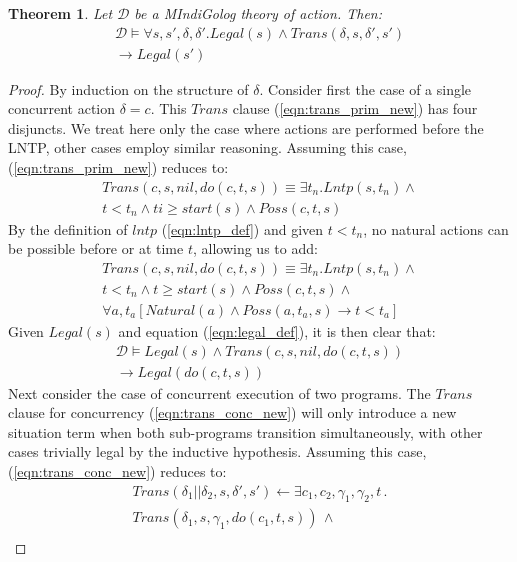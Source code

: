 \documentclass[letterpaper]{article}
\newtheorem{theorem}{Theorem}
\begin{document}
\begin{theorem}
\label{thm:trans_legal}
Let $\mathcal{D}$ be a MIndiGolog theory of action. Then:
\begin{multline*}
\mathcal{D} \models \forall s,s',\delta,\delta'.Legal(s)\wedge Trans(\delta,s,\delta',s')\\
\rightarrow Legal(s')
\end{multline*}
\end{theorem}

\begin{proof}
By induction on the structure of $\delta$.
Consider first the case of a single concurrent action $\delta=c$.  This
$Trans$ clause (\ref{eqn:trans_prim_new}) has four disjuncts. We treat
here only the
case where actions are performed before the LNTP, other
cases employ similar reasoning.
Assuming this case, (\ref{eqn:trans_prim_new}) reduces to:
\begin{multline*}
Trans(c,s,nil,do(c,t,s)) \equiv \exists t_n . Lntp(s,t_n) \wedge \\
  t < t_n \wedge ti \geq start(s) \wedge Poss(c,t,s)
\end{multline*}
By the definition of $lntp$ (\ref{eqn:lntp_def}) and given $t < t_n$,
no natural actions
can be possible before or at time $t$, allowing us to add:
\begin{multline*}
Trans(c,s,nil,do(c,t,s)) \equiv \exists t_n . Lntp(s,t_n) \wedge \\
  t < t_n \wedge t \geq start(s) \wedge Poss(c,t,s) \wedge\\
  \forall a,t_a \left[ Natural(a) \wedge Poss(a,t_a,s) \rightarrow t < t_a \right]
\end{multline*}
Given $Legal(s)$ and equation (\ref{eqn:legal_def}), it is then clear that:
\begin{multline*}
\mathcal{D} \models Legal(s) \wedge Trans(c,s,nil,do(c,t,s))\\
\rightarrow Legal(do(c,t,s))
\end{multline*}
Next consider the case of concurrent execution of two programs.  The $Trans$
clause  for concurrency (\ref{eqn:trans_conc_new}) will only introduce a
new situation term when both
sub-programs transition simultaneously, with other cases trivially legal by
the inductive hypothesis.  Assuming this case, (\ref{eqn:trans_conc_new})
reduces to:
\begin{multline*}
Trans(\delta_{1}||\delta_{2},s,\delta',s')\leftarrow \exists c_{1},c_{2},\gamma_{1},\gamma_{2},t\,.\\
Trans(\delta_{1},s,\gamma_{1},do(c_{1},t,s))\,\wedge\\

\end{multline*}
\end{proof}
\end{document}
